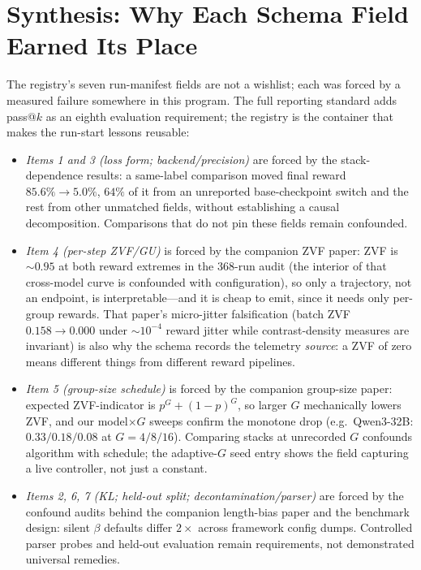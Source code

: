 \section{Synthesis: Why Each Schema Field Earned Its Place}
\label{sec:p6-synthesis}

The registry's seven run-manifest fields are not a wishlist; each was forced by
a measured failure somewhere in this program. The full reporting standard adds
pass@$k$ as an eighth evaluation requirement; the registry is the container that
makes the run-start lessons reusable:

\begin{itemize}[leftmargin=1.5em, itemsep=0.15em]
  \item \emph{Items 1 and 3 (loss form; backend/precision)} are forced by the
        stack-dependence results: a same-label comparison moved final reward
        $85.6\% \to 5.0\%$, $64\%$ of it from an unreported base-checkpoint
        switch and the rest from other unmatched fields,
        without establishing a causal decomposition. Comparisons that do
        not pin these fields remain confounded.
  \item \emph{Item 4 (per-step ZVF/GU)} is forced by the companion ZVF paper: ZVF
        is ${\sim}0.95$ at both reward extremes in the 368-run audit (the
        interior of that cross-model curve is confounded with configuration),
        so only a trajectory, not an endpoint, is interpretable---and it is cheap to emit, since it needs
        only per-group rewards. That paper's micro-jitter falsification
        (batch ZVF $0.158 \to 0.000$ under $\sim$$10^{-4}$ reward jitter while
        contrast-density measures are invariant) is also why the schema
        records the telemetry \emph{source}: a ZVF of zero means different
        things from different reward pipelines.
  \item \emph{Item 5 (group-size schedule)} is forced by the companion group-size
        paper: expected ZVF-indicator is $p^G + (1-p)^G$, so larger $G$
        mechanically lowers ZVF, and our model$\times G$ sweeps confirm the
        monotone drop (e.g.\ Qwen3-32B: $0.33/0.18/0.08$ at $G{=}4/8/16$).
        Comparing stacks at unrecorded $G$ confounds algorithm with schedule;
        the adaptive-$G$ seed entry shows the field capturing a live
        controller, not just a constant.
  \item \emph{Items 2, 6, 7 (KL; held-out split; decontamination/parser)} are
        forced by the confound audits behind the companion length-bias paper and the benchmark design: silent $\beta$ defaults differ $2\times$
        across framework config dumps. Controlled parser probes and held-out
        evaluation remain requirements, not demonstrated universal remedies.
\end{itemize}

